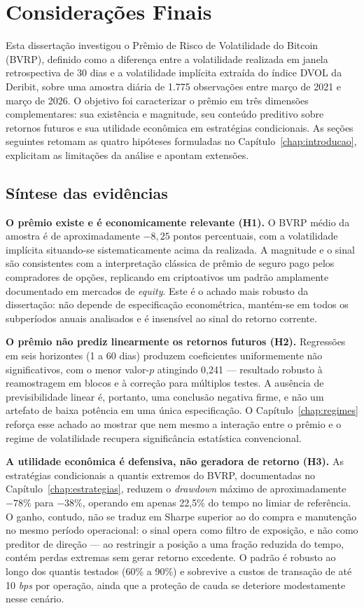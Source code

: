 \chapter{Considerações Finais}
\label{chap:conclusao}

Esta dissertação investigou o Prêmio de Risco de Volatilidade do Bitcoin (BVRP), definido como a diferença entre a volatilidade realizada em janela retrospectiva de 30 dias e a volatilidade implícita extraída do índice DVOL da Deribit, sobre uma amostra diária de 1.775 observações entre março de 2021 e março de 2026. O objetivo foi caracterizar o prêmio em três dimensões complementares: sua existência e magnitude, seu conteúdo preditivo sobre retornos futuros e sua utilidade econômica em estratégias condicionais. As seções seguintes retomam as quatro hipóteses formuladas no Capítulo~\ref{chap:introducao}, explicitam as limitações da análise e apontam extensões.

\section{Síntese das evidências}
\label{sec:conclusao_sintese}

\textbf{O prêmio existe e é economicamente relevante (H1).} O BVRP médio da amostra é de aproximadamente $-8{,}25$ pontos percentuais, com a volatilidade implícita situando-se sistematicamente acima da realizada. A magnitude e o sinal são consistentes com a interpretação clássica de prêmio de seguro pago pelos compradores de opções, replicando em criptoativos um padrão amplamente documentado em mercados de \emph{equity}. Este é o achado mais robusto da dissertação: não depende de especificação econométrica, mantém-se em todos os subperíodos anuais analisados e é insensível ao sinal do retorno corrente.

\textbf{O prêmio não prediz linearmente os retornos futuros (H2).} Regressões em seis horizontes (1 a 60 dias) produzem coeficientes uniformemente não significativos, com o menor valor-$p$ atingindo 0,241 --- resultado robusto à reamostragem em blocos e à correção para múltiplos testes. A ausência de previsibilidade linear é, portanto, uma conclusão negativa firme, e não um artefato de baixa potência em uma única especificação. O Capítulo~\ref{chap:regimes} reforça esse achado ao mostrar que nem mesmo a interação entre o prêmio e o regime de volatilidade recupera significância estatística convencional.

\textbf{A utilidade econômica é defensiva, não geradora de retorno (H3).} As estratégias condicionais a quantis extremos do BVRP, documentadas no Capítulo~\ref{chap:estrategias}, reduzem o \emph{drawdown} máximo de aproximadamente $-78\%$ para $-38\%$, operando em apenas 22,5\% do tempo no limiar de referência. O ganho, contudo, não se traduz em Sharpe superior ao do compra e manutenção no mesmo período operacional: o sinal opera como filtro de exposição, e não como preditor de direção --- ao restringir a posição a uma fração reduzida do tempo, contém perdas extremas sem gerar retorno excedente. O padrão é robusto ao longo dos quantis testados (60\% a 90\%) e sobrevive a custos de transação de até 10 \emph{bps} por operação, ainda que a proteção de cauda se deteriore modestamente nesse cenário.

